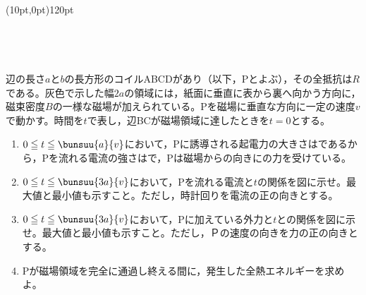 \hakosyokika
\item
    \begin{mawarikomi}(10pt,0pt){120pt}{
        \\
        \\
        \\
        \\
        \\

    }
    辺の長さ$a$と$b$の長方形のコイルABCDがあり（以下，Pとよぶ），その全抵抗は$R$\tanni{\Omega }である。灰色で示した幅$2a$の領域には，紙面に垂直に表から裏へ向かう方向に，磁束密度$B$の一様な磁場が加えられている。Pを磁場に垂直な方向に一定の速度$v$で動かす。時間を$t$で表し，辺BCが磁場領域に達したときを$t=0$とする。
        \begin{enumerate}
            \item $0\leqq t \leqq \bunsuu{a}{v}$において，Pに誘導される起電力の大きさは\Hako {}であるから，Pを流れる電流の強さは\Hako {}で，Pは磁場から\Hako の向きに\Hako {}の力を受けている。
            \item $0\leqq t\leqq \bunsuu{3a}{v}$において，Pを流れる電流と$t$の関係を図に示せ。最大値と最小値も示すこと。ただし，時計回りを電流の正の向きとする。
            \item $0\leqq t\leqq \bunsuu{3a}{v}$において，Pに加えている外力と$t$との関係を図に示せ。最大値と最小値も示すこと。ただし，Ｐの速度の向きを力の正の向きとする。
            \item Pが磁場領域を完全に通過し終える間に，発生した全熱エネルギーを求めよ。
        \end{enumerate}
    \end{mawarikomi}